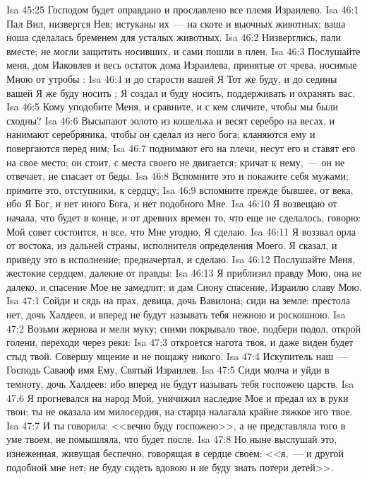 \vs Isa 45:25 Господом будет оправдано и прославлено все племя Израилево.
\vs Isa 46:1 Пал Вил, низвергся Нев; истуканы их~--- на скоте и вьючных животных; ваша ноша сделалась бременем для усталых животных.
\vs Isa 46:2 Низверглись, пали вместе; не могли защитить носивших, и сами пошли в плен.
\rsbpar\vs Isa 46:3 Послушайте меня, дом Иаковлев и весь остаток дома Израилева, принятые  от чрева, носимые Мною от утробы :
\vs Isa 46:4 и до старости вашей Я Тот же буду, и до седины вашей Я же буду носить ; Я создал и буду носить, поддерживать и охранять вас.
\vs Isa 46:5 Кому уподобите Меня, и  сравните, и с кем сличите, чтобы мы были сходны?
\vs Isa 46:6 Высыпают золото из кошелька и весят серебро на весах, и нанимают серебряника, чтобы он сделал из него бога; кланяются ему и повергаются перед ним;
\vs Isa 46:7 поднимают его на плечи, несут его и ставят его на свое место; он стоит, с места своего не двигается; кричат к нему,~--- он не отвечает, не спасает от беды.
\vs Isa 46:8 Вспомните это и покажите себя мужами; примите это, отступники, к сердцу;
\vs Isa 46:9 вспомните прежде бывшее, от  века, ибо Я Бог, и нет иного Бога, и нет подобного Мне.
\vs Isa 46:10 Я возвещаю от начала, что будет в конце, и от древних времен то, что еще не сделалось, говорю: Мой совет состоится, и все, что Мне угодно, Я сделаю.
\vs Isa 46:11 Я воззвал орла от востока, из дальней страны, исполнителя определения Моего. Я сказал, и приведу это в исполнение; предначертал, и сделаю.
\vs Isa 46:12 Послушайте Меня, жестокие сердцем, далекие от правды:
\vs Isa 46:13 Я приблизил правду Мою, она не далеко, и спасение Мое не замедлит; и дам Сиону спасение, Израилю славу Мою.
\vs Isa 47:1 Сойди и сядь на прах, девица, дочь Вавилона; сиди на земле: престола нет, дочь Халдеев, и вперед не будут называть тебя нежною и роскошною.
\vs Isa 47:2 Возьми жернова и мели муку; сними покрывало твое, подбери подол, открой голени, переходи через реки:
\vs Isa 47:3 откроется нагота твоя, и даже виден будет стыд твой. Совершу мщение и не пощажу никого.
\vs Isa 47:4 Искупитель наш~--- Господь Саваоф имя Ему, Святый Израилев.
\vs Isa 47:5 Сиди молча и уйди в темноту, дочь Халдеев: ибо вперед не будут называть тебя госпожею царств.
\vs Isa 47:6 Я прогневался на народ Мой, уничижил наследие Мое и предал их в руки твои;  ты не оказала им милосердия, на старца налагала крайне тяжкое иго твое.
\vs Isa 47:7 И ты говорила: <<вечно буду госпожею>>, а не представляла того в уме твоем, не помышляла, что будет после.
\vs Isa 47:8 Но ныне выслушай это, изнеженная, живущая беспечно, говорящая в сердце своем: <<я,~--- и другой подобной мне нет; не буду сидеть вдовою и не буду знать потери детей>>.
